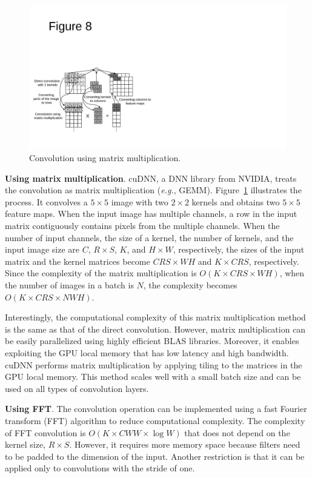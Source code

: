\begin{figure}[htbp]
  \centering
  \includegraphics[width=\linewidth]{./figures/matmul}
  \caption{Convolution using matrix multiplication.}
  \label{fig_matmul}
\end{figure}

{\bf Using matrix multiplication}. cuDNN\cite{cudnn}, a DNN library from NVIDIA, treats the convolution as matrix multiplication (\textit{e.g.}, GEMM\cite{cublas}). Figure~\ref{fig_matmul} illustrates the process. It convolves a $5 \times 5$ image with two $2 \times 2$ kernels and obtains two $5 \times 5$ feature maps. When the input image has multiple channels, a row in the input matrix contiguously contains pixels from the multiple channels. When the number of input channels, the size of a kernel, the number of kernels, and the input image size are $C$, $R \times S$, $K$, and $H \times W$, respectively, the sizes of the input matrix and the kernel matrices become $CRS \times WH$ and $K \times CRS$, respectively. Since the complexity of the matrix multiplication is $O(K \times CRS \times WH)$, when the number of images in a batch is $N$, the complexity becomes $O(K \times CRS \times NWH)$. 

Interestingly, the computational complexity of this matrix multiplication method is the same as that of the direct convolution. However, matrix multiplication can be easily parallelized using highly efficient BLAS libraries\cite{cublas}. Moreover, it enables exploiting the GPU local memory that has  low latency and high bandwidth. cuDNN performs matrix multiplication by applying tiling to the matrices in the GPU local memory. This method scales well with a small batch size and can be used on all types of convolution layers. 

{\bf Using FFT}. The convolution operation can be implemented using a fast Fourier transform (FFT) algorithm to reduce computational complexity\cite{fftconv}. The complexity of FFT convolution is $O(K \times CWW \times \log W)$ that does not depend on the kernel size, $R \times S$. However, it requires more memory space because filters need to be padded to the dimension of the input. Another restriction is that it can be applied only to convolutions with the stride of one.

